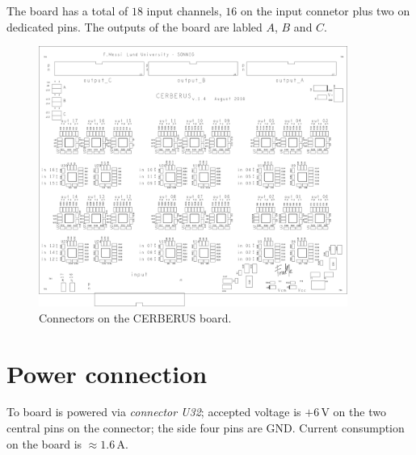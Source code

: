 \documentclass[fyslu,english]{report}
\begin{document}
The board has a total of $18$ input channels, $16$ on the input connetor plus two on dedicated pins. 
The outputs of the board are labled $A$, $B$ and $C$.

\begin{figure}[htbp]
\begin{center}
\includegraphics[width=0.9\textwidth]{Cerberus_v1-4_SLKTOP.png}%
\caption{Connectors on the CERBERUS board.}
\label{fig.connectors}
\end{center}
\end{figure}

\section{Power connection}
To board is powered via \emph{connector U32}; accepted voltage is $+6\,\si\V$ on the two central pins on the connector; the side four pins are GND. 
Current consumption on the board is $\approx 1.6\,\si\A$.

\newpage

\end{document}

